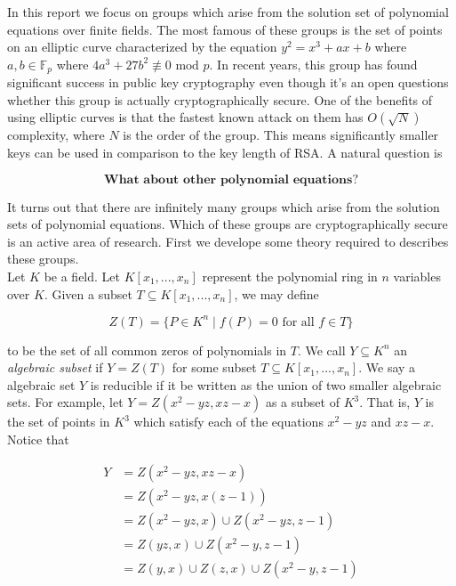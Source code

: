 

In this report we focus on groups which arise from the solution set of polynomial equations over finite fields. The most famous of these groups is the set of points on an elliptic curve characterized by the equation $y^2 = x^3 + ax + b$ where $a,b \in \mathbb{F}_p$ where $4a^3 + 27b^2 \not\equiv 0 \text{ mod } p$. In recent years, this group has found significant success in public key cryptography even though it's an open questions whether this group is actually cryptographically secure. One of the benefits of using elliptic curves is that the fastest known attack on them has $O(\sqrt{N})$ complexity, where $N$ is the order of the group. This means significantly smaller keys can be used in comparison to the key length of RSA. A natural question is 

$$
\textbf{What about other polynomial equations?}
$$ 

It turns out that there are infinitely many groups which arise from the solution sets of polynomial equations. Which of these groups are cryptographically secure is an active area of research. First we develope some theory required to describes these groups. \\ 

Let $K$ be a field. Let $K[x_1,...,x_n]$ represent the polynomial ring in $n$ variables over $K$. Given a subset $T \subseteq K[x_1,...,x_n] $, we may define 

$$
Z(T) = \lbrace P \in K^n \mid f(P) = 0 \text{ for all } f \in T \rbrace 
$$ 

to be the set of all common zeros of polynomials in $T$. We call $Y \subseteq K^n $ an \textit{algebraic subset} if $Y = Z(T)$ for some subset $T \subseteq K[x_1,...,x_n]$. We say a algebraic set $Y$ is reducible if it be written as the union of two smaller algebraic sets. For example, let $Y = Z(x^2 - yz, xz-x)$ as a subset of $K^3$. That is, $Y$ is the set of points in $K^3$ which satisfy each of the equations $x^2 - yz$ and $xz-x$. Notice that

\begin{align*}
	Y &= Z(x^2 - yz, xz-x) \\
	&= Z(x^2 - yz, x(z-1)) \\
	&= Z(x^2 - yz,x) \cup Z(x^2 - yz,z-1) \\
	&= Z(yz,x) \cup Z(x^2 - y,z -1) \\
	&= Z(y,x) \cup Z(z,x) \cup Z(x^2 - y, z - 1)
\end{align*} 

